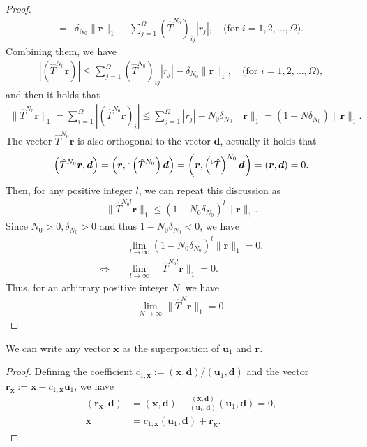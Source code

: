 \begin{proof}
\begin{align}
	=& \delta_{N_{0}}\|\bm{r}\|_{1} - \sum_{j=1}^{\Omega}\left(\hat{T}^{N_{0}}\right)_{ij}|r_{j}|,\quad\text{(for $i=1,2,\dots,\Omega$)}.
	\end{align}
	Combining them, we have
	\begin{align}
	|\left(\hat{T}^{N_{0}}\bm{r}\right)| \leq \sum_{j=1}^{\Omega}\left(\hat{T}^{N_{0}}\right)_{ij}|r_{j}| - \delta_{N_{0}}\|\bm{r}\|_{1},\quad\text{(for $i=1,2,\dots,\Omega$)},
	\end{align}
	and then it holds that
	\begin{align}
	\|\hat{T}^{N_{0}}\bm{r}\|_{1} = \sum_{i=1}^{\Omega}|\left(\hat{T}^{N_{0}}\bm{r}\right)_{i}| \leq \sum_{j=1}^{\Omega}|r_{j}| - N_{0}\delta_{N_{0}}\|\bm{r}\|_{1} = (1-N\delta_{N_{0}})\|\bm{r}\|_{1}.
	\end{align}
	The vector $\hat{T}^{N_{0}}\bm{r}$ is also orthogonal to the vector $\bm{d}$, actually it holds that
	\begin{align}
	\left(\hat{T}^{N_{0}}\bm{r},\bm{d}\right) = \left(\bm{r},{}^{\rm t}\left(\hat{T}^{N_{0}}\right)\bm{d}\right) = \left(\bm{r},\left({}^{\rm t}\hat{T}\right)^{N_{0}}\bm{d}\right) = \left(\bm{r},\bm{d}\right) = 0.
	\end{align}
	Then, for any positive integer $l$, we can repeat this discussion as
	\begin{align}
	\|\hat{T}^{N_{0}l}\bm{r}\|_{1} \leq (1-N_{0}\delta_{N_{0}})^{l}\|\bm{r}\|_{1}.
	\end{align}
	Since $N_{0}>0, \delta_{N_{0}}>0$ and thus $1-N_{0}\delta_{N_{0}} < 0$, we have
	\begin{align}
	&\lim_{l\to\infty}(1-N_{0}\delta_{N_{0}})^{l}\|\bm{r}\|_{1} = 0.\\
	\Longleftrightarrow\quad&\lim_{l\to\infty}\|\hat{T}^{N_{0}l}\bm{r}\|_{1} = 0.
	\end{align}
	Thus, for an arbitrary positive integer $N$, we have
	\begin{align}
	\lim_{N\to\infty}\|\hat{T}^{N}\bm{r}\|_{1} = 0.
	\end{align}
\end{proof}

\begin{theorem}\label{theo:SupPos}
	We can write any vector $\bm{x}$ as the superposition of $\bm{u}_{1}$ and $\bm{r}$.
\end{theorem}

\begin{proof}
	Defining the coefficient $c_{1,\bm{x}}:=(\bm{x},\bm{d})/(\bm{u}_{1},\bm{d})$ and the vector $\bm{r}_{\bm{x}}:=\bm{x} - c_{1,\bm{x}}\bm{u}_{1}$, we have
	\begin{align}
	(\bm{r}_{\bm{x}},\bm{d}) &= (\bm{x},\bm{d}) - \frac{(\bm{x},\bm{d})}{(\bm{u}_{1},\bm{d})}(\bm{u}_{1},\bm{d}) = 0,\\
	\bm{x} &= c_{1,\bm{x}}(\bm{u}_{1},\bm{d}) + \bm{r}_{\bm{x}}.
	\end{align}
\end{proof}

